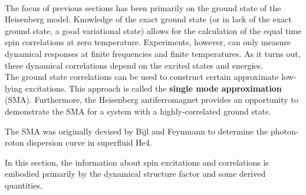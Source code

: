 \documentclass{homework}
\begin{document}
\blanky \\

\begin{tcolorbox}[colback =yellow, title = Physical Context]

The focus of previous sections has  been primarily on the ground state of the Heisenberg model. Knowledge of the exact ground state (or in lack of the exact ground state, a good variational state) allows for the calculation of the equal time spin correlations at zero temperature. Experiments, however, can only measure dynamical responses at finite frequencies and finite temperatures. As it turns out, these dynamical correlations depend on the excited states and energies. \\

The ground state correlations can be used to construct certain approximate low-lying excitations. This approach is called the \textbf{single mode approximation} (SMA). Furthermore, the Heisenberg antiferromagnet provides an opportunity to demonstrate the SMA for a system with a highly-correlated ground state. 

\end{tcolorbox}

\begin{tcolorbox}[colback = LimeGreen, title = Historical Context]

The SMA was originally devised by Bijl and Feynmann  to determine the photon-roton dispersion curve in superfluid He4.

\end{tcolorbox}

In this section, the information about spin excitations and correlations is embodied primarily by the dynamical structure factor and some derived quantities, 
\end{document}

